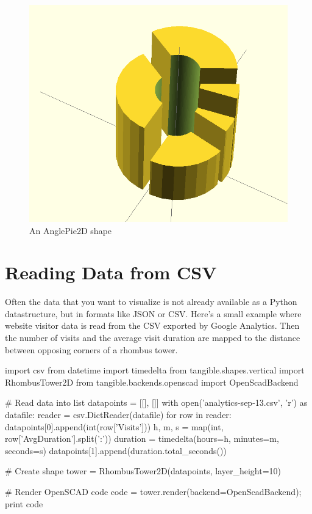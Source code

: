 \begin{figure}[H]
	\centering
	\includegraphics[height=.3\textheight]{images/angle_pie.png}
	\caption{An AnglePie2D shape}
	\label{img:angle_pie}
\end{figure}


\newpage
\section{Reading Data from CSV}\label{sec:csv}

Often the data that you want to visualize is not already available as a Python
datastructure, but in formats like JSON or CSV. Here's a small example where
website visitor data is read from the CSV exported by Google Analytics. Then the
number of visits and the average visit duration are mapped to the distance
between opposing corners of a rhombus tower.

\vspace{.5\baselineskip}
\begin{pythoncode}
import csv
from datetime import timedelta
from tangible.shapes.vertical import RhombusTower2D
from tangible.backends.openscad import OpenScadBackend

# Read data into list
datapoints = [[], []]
with open('analytics-sep-13.csv', 'r') as datafile:
    reader = csv.DictReader(datafile)
    for row in reader:
        datapoints[0].append(int(row['Visits']))
        h, m, s = map(int, row['AvgDuration'].split(':'))
        duration = timedelta(hours=h, minutes=m, seconds=s)
        datapoints[1].append(duration.total_seconds())

# Create shape
tower = RhombusTower2D(datapoints, layer_height=10)

# Render OpenSCAD code
code = tower.render(backend=OpenScadBackend); print code
\end{pythoncode}
\vspace{.5\baselineskip}


